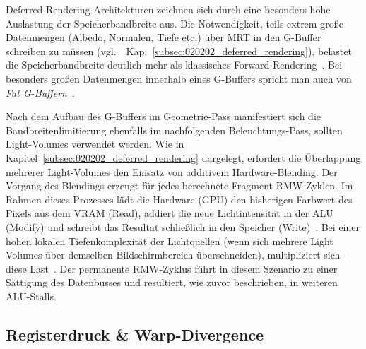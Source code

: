 Deferred-Rendering-Architekturen zeichnen sich durch eine besonders hohe Auslastung der Speicherbandbreite aus.
Die Notwendigkeit, teils extrem große Datenmengen (Albedo, Normalen, Tiefe etc.) über \ac{MRT} in den \ac{G-Buffer}
schreiben zu müssen (vgl.\ ~Kap.~\ref{subsec:020202_deferred_rendering}), belastet die Speicherbandbreite deutlich
mehr als klassisches
Forward-Rendering~\parencites(vgl.)()[S.~32]{AdvancesRealTimeRendering}[Abschn.~2.1]{Thaler2011DeferredRendering}.
Bei besonders großen Datenmengen innerhalb eines \ac{G-Buffer}s spricht man auch von
\textit{Fat \ac{G-Buffer}n}~\parencite[vgl.][S.~71]{AdvancesRealTimeRendering}.

Nach dem Aufbau des \ac{G-Buffer}s im Geometrie-Pass manifestiert sich die Bandbreitenlimitierung ebenfalls im
nachfolgenden Beleuchtungs-Pass, sollten Light-Volumes verwendet werden.
Wie in Kapitel~\ref{subsec:020202_deferred_rendering} dargelegt, erfordert die Überlappung mehrerer Light-Volumes
den Einsatz von additivem Hardware-Blending.
Der Vorgang des Blendings erzeugt für jedes berechnete Fragment \ac{RMW}-Zyklen.
Im Rahmen dieses Prozesses lädt die Hardware (\ac{GPU}) den bisherigen Farbwert des Pixels aus dem \ac{VRAM} (Read),
addiert die neue Lichtintensität in der \ac{ALU} (Modify) und schreibt das Resultat schließlich in den Speicher
(Write)~\parencites(vgl.)()[Kap.~18.2.5]{akenine-mollerRealtimeRendering2019}[S.~676]{gregoryGameEngineArchitecture2018}.
Bei einer hohen lokalen Tiefenkomplexität der Lichtquellen
(wenn sich mehrere Light Volumes über demselben Bildschirmbereich überschneiden), multipliziert sich diese
Last~\parencite[vgl.][Folie~9]{lauritzenDeferredRenderingCurrent}.
Der permanente \ac{RMW}-Zyklus führt in diesem Szenario zu einer Sättigung des Datenbusses und resultiert, wie zuvor
beschrieben, in weiteren \ac{ALU}-Stalls.

\subsection{Registerdruck \& Warp-Divergence}
\label{subsec:020303_warp_divergence_and_register_pressure}


